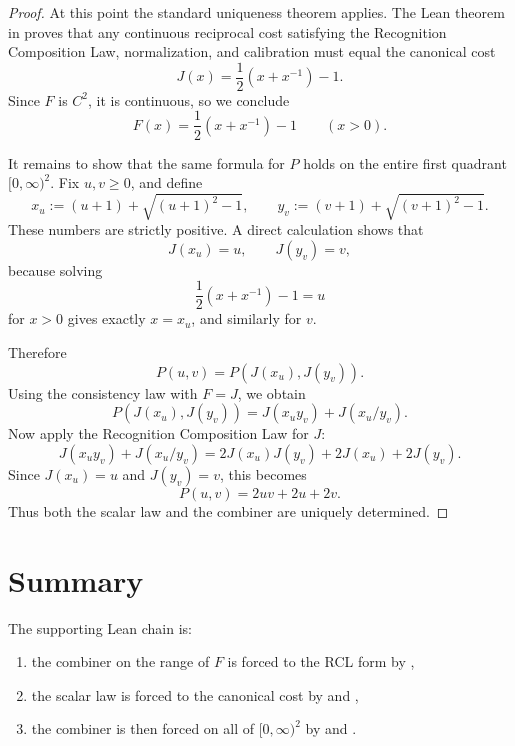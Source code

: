 \documentclass[11pt]{article}
\theoremstyle{plain}
\newcommand{\Jcost}{J}
\begin{document}
\begin{proof}
At this point the standard uniqueness theorem applies. The Lean theorem
 in
 proves that any
continuous reciprocal cost satisfying the Recognition Composition Law,
normalization, and calibration must equal the canonical cost
\[
\Jcost(x)=\frac12(x+x^{-1})-1.
\]
Since $F$ is $C^2$, it is continuous, so we conclude
\[
F(x)=\frac12(x+x^{-1})-1 \qquad (x>0).
\]

It remains to show that the same formula for $P$ holds on the entire first
quadrant $[0,\infty)^2$. Fix $u,v\ge 0$, and define
\[
x_u:=(u+1)+\sqrt{(u+1)^2-1},
\qquad
y_v:=(v+1)+\sqrt{(v+1)^2-1}.
\]
These numbers are strictly positive. A direct calculation shows that
\[
\Jcost(x_u)=u,\qquad \Jcost(y_v)=v,
\]
because solving
\[
\frac12(x+x^{-1})-1=u
\]
for $x>0$ gives exactly $x=x_u$, and similarly for $v$.

Therefore
\[
P(u,v)=P(\Jcost(x_u),\Jcost(y_v)).
\]
Using the consistency law with $F=\Jcost$, we obtain
\[
P(\Jcost(x_u),\Jcost(y_v))
=\Jcost(x_u y_v)+\Jcost(x_u/y_v).
\]
Now apply the Recognition Composition Law for $\Jcost$:
\[
\Jcost(x_u y_v)+\Jcost(x_u/y_v)
=2\Jcost(x_u)\Jcost(y_v)+2\Jcost(x_u)+2\Jcost(y_v).
\]
Since $\Jcost(x_u)=u$ and $\Jcost(y_v)=v$, this becomes
\[
P(u,v)=2uv+2u+2v.
\]
Thus both the scalar law and the combiner are uniquely determined.
\end{proof}

\section*{Summary}
The supporting Lean chain is:
\begin{enumerate}[nosep]
\item the combiner on the range of $F$ is forced to the RCL form by
,
\item the scalar law is forced to the canonical cost by
 and
,
\item the combiner is then forced on all of $[0,\infty)^2$ by
 and .
\end{enumerate}
\end{document}
